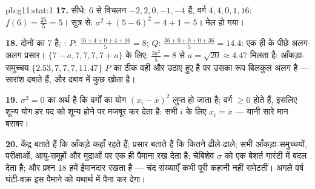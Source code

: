 \begin{solution}{pb:g11:stat:1}
\textbf{17.} सीधे: $6$ से विचलन $-2, 2, 0, -1, -4$ हैं, वर्ग $4, 4, 0, 1, 16$: $f(6) = \frac{25}{5} = 5$। सूत्र से:
$\sigma^2 + (5 - 6)^2 = 4 + 1 = 5$। मेल हो गया।

\textbf{18.} दोनों का  $7$ है; : $P$: $\frac{16 + 4 + 0 + 4 + 16}{5} = 8$; $Q$: $\frac{36 + 0 + 0 + 0 + 36}{5} = 14.4$:
एक ही  के पीछे अलग-अलग प्रसार। $\{7 - a, 7, 7, 7, 7 + a\}$ के लिए:  $\frac{2a^2}{5} = 8$ से $a = \sqrt{20} \approx 4.47$
मिलता है: आँकड़ा-समुच्चय $\{2.53, 7, 7, 7, 11.47\}$ $P$ का ठीक वही  और  उठाए हुए है
पर उसका रूप बिलकुल अलग है --- सारांश दबाते हैं, और दबाव में कुछ खोता है।

\textbf{19.} $\sigma^2 = 0$ का अर्थ है कि वर्गों का योग $(x_i - \bar x)^2$ लुप्त हो जाता है; वर्ग
$\geq 0$ होते हैं, इसलिए शून्य योग हर पद को शून्य होने पर मजबूर कर देता है:
सभी $i$ के लिए $x_i = \bar x$ --- यानी सारे मान बराबर।

\textbf{20.} केंद्र बताते हैं कि आँकड़े कहाँ रहते हैं; प्रसार बताते हैं कि
कितने ढीले-ढाले;  सभी आँकड़ा-समुच्चयों, परीक्षाओं, आयु-समूहों और
मुद्राओं पर एक ही पैमाना रख देता है; चेबिशेव $\sigma$ को एक बेशर्त गारंटी में
बदल देता है; और प्रश्न 18 हमें ईमानदार रखता है --- चंद संख्याएँ कभी पूरी
कहानी नहीं समेटतीं। अगले वर्ष घंटी-वक्र इस पैमाने को यथार्थ  में
पैना कर देगा।
\end{solution}
